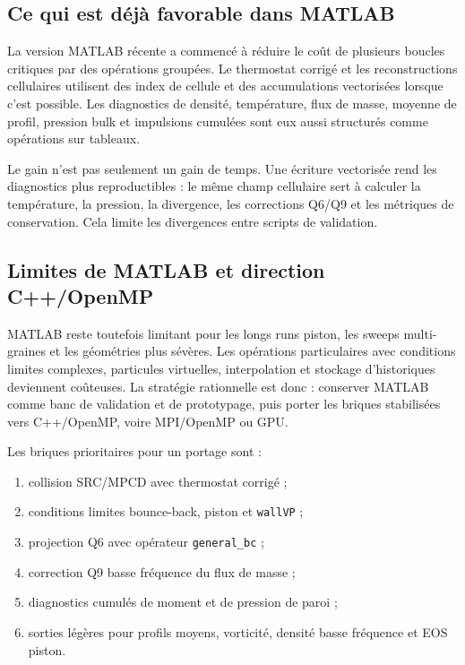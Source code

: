 \documentclass[11pt,a4paper]{article}
\begin{document}
\subsection{Ce qui est déjà favorable dans MATLAB}

La version MATLAB récente a commencé à réduire le coût de plusieurs boucles critiques par des opérations groupées. Le thermostat corrigé et les reconstructions cellulaires utilisent des index de cellule et des accumulations vectorisées lorsque c'est possible. Les diagnostics de densité, température, flux de masse, moyenne de profil, pression bulk et impulsions cumulées sont eux aussi structurés comme opérations sur tableaux.

Le gain n'est pas seulement un gain de temps. Une écriture vectorisée rend les diagnostics plus reproductibles : le même champ cellulaire sert à calculer la température, la pression, la divergence, les corrections Q6/Q9 et les métriques de conservation. Cela limite les divergences entre scripts de validation.

\subsection{Limites de MATLAB et direction C++/OpenMP}

MATLAB reste toutefois limitant pour les longs runs piston, les sweeps multi-graines et les géométries plus sévères. Les opérations particulaires avec conditions limites complexes, particules virtuelles, interpolation et stockage d'historiques deviennent coûteuses. La stratégie rationnelle est donc : conserver MATLAB comme banc de validation et de prototypage, puis porter les briques stabilisées vers C++/OpenMP, voire MPI/OpenMP ou GPU.

Les briques prioritaires pour un portage sont :
\begin{enumerate}[label=\arabic*)]
  \item collision SRC/MPCD avec thermostat corrigé ;
  \item conditions limites bounce-back, piston et \texttt{wallVP} ;
  \item projection Q6 avec opérateur \texttt{general\_bc} ;
  \item correction Q9 basse fréquence du flux de masse ;
  \item diagnostics cumulés de moment et de pression de paroi ;
  \item sorties légères pour profils moyens, vorticité, densité basse fréquence et EOS piston.
\end{enumerate}
\end{document}
